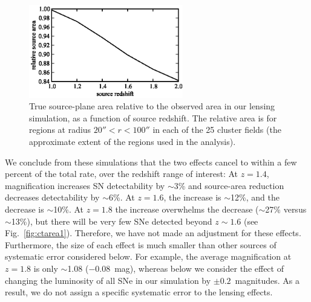 \begin{figure}
\includegraphics[width=0.6\textwidth]{figures/fieldrate/sourcearea.eps}
\caption[Source-plane area versus observed area in lensing
  simulation]{True source-plane area relative to the observed area in
  our lensing simulation, as a function of source redshift. The
  relative area is for regions at radius $20'' < r < 100''$ in each of
  the 25 cluster fields (the approximate extent of the regions used in
  the analysis). \label{fig:sourcearea}}
\end{figure}


We conclude from these simulations that the two effects cancel to
within a few percent of the total rate, over the redshift range of
interest: At $z=1.4$, magnification increases SN detectability by
$\sim$3\% and source-area reduction decreases detectability by
$\sim$6\%. At $z=1.6$, the increase is $\sim$12\%, and the decrease is
$\sim$10\%. At $z=1.8$ the increase overwhelms the decrease
($\sim$27\% versus $\sim$13\%), but there will be very few SNe
detected beyond $z \sim 1.6$ (see Fig.~\ref{fig:ctarea1}). Therefore,
we have not made an adjustment for these effects. Furthermore, the
size of each effect is much smaller than other sources of systematic
error considered below. For example, the average magnification at
$z=1.8$ is only $\sim$1.08 ($-0.08$~mag), whereas below we consider
the effect of changing the luminosity of all SNe in our simulation by
$\pm 0.2$~magnitudes. As a result, we do not assign a specific
systematic error to the lensing effects.


